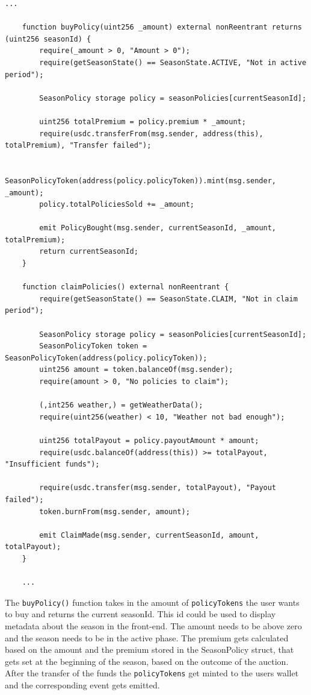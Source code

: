 \documentclass[11pt,a4paper]{article}
\begin{document}
    \begin{lstlisting}[style=soliditystyle, caption={RainyDayFund.sol - Main Insurance Contract},label={lst:lstlisting3}]
    ...

    function buyPolicy(uint256 _amount) external nonReentrant returns (uint256 seasonId) {
        require(_amount > 0, "Amount > 0");
        require(getSeasonState() == SeasonState.ACTIVE, "Not in active period");

        SeasonPolicy storage policy = seasonPolicies[currentSeasonId];

        uint256 totalPremium = policy.premium * _amount;
        require(usdc.transferFrom(msg.sender, address(this), totalPremium), "Transfer failed");

        SeasonPolicyToken(address(policy.policyToken)).mint(msg.sender, _amount);
        policy.totalPoliciesSold += _amount;

        emit PolicyBought(msg.sender, currentSeasonId, _amount, totalPremium);
        return currentSeasonId;
    }

    function claimPolicies() external nonReentrant {
        require(getSeasonState() == SeasonState.CLAIM, "Not in claim period");

        SeasonPolicy storage policy = seasonPolicies[currentSeasonId];
        SeasonPolicyToken token = SeasonPolicyToken(address(policy.policyToken));
        uint256 amount = token.balanceOf(msg.sender);
        require(amount > 0, "No policies to claim");

        (,int256 weather,) = getWeatherData();
        require(uint256(weather) < 10, "Weather not bad enough");

        uint256 totalPayout = policy.payoutAmount * amount;
        require(usdc.balanceOf(address(this)) >= totalPayout, "Insufficient funds");

        require(usdc.transfer(msg.sender, totalPayout), "Payout failed");
        token.burnFrom(msg.sender, amount);

        emit ClaimMade(msg.sender, currentSeasonId, amount, totalPayout);
    }

    ...
    \end{lstlisting}

    The \texttt{buyPolicy()} function takes in the amount of \texttt{policyTokens} the user wants to buy and returns the current seasonId.
    This id could be used to display metadata about the season in the front-end.
    The amount needs to be above zero and the season needs to be in the active phase.
    The premium gets calculated based on the amount and the premium stored in the SeasonPolicy struct, that gets set at the beginning of the season, based on the outcome of the auction.
    After the transfer of the funds the \texttt{policyTokens} get minted to the users wallet and the corresponding event gets emitted.
\end{document}
